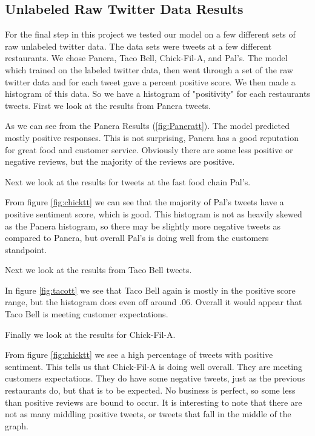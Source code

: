 \documentclass[titlepage,letterpaper]{article}
\begin{document}
\subsection{Unlabeled Raw Twitter Data Results}



For the final step in this project we tested our model on a few different sets of raw unlabeled twitter data. The data sets were tweets at a few different restaurants. We chose Panera, Taco Bell, Chick-Fil-A, and Pal's. The model which trained on the labeled twitter data, then went through a set of the raw twitter data and for each tweet gave a percent positive score. We then made a histogram of this data. So we have a histogram of "positivity" for each restaurants tweets. First we look at the results from Panera tweets. 



As we can see from the Panera Results (\cref{fig:Paneratt}). The model predicted mostly positive responses. This is not surprising, Panera has a good reputation for great food and customer service. Obviously there are some less positive or negative reviews, but the majority of the reviews are positive.

Next we look at the results for tweets at the fast food chain Pal's.



From figure \cref{fig:chicktt} we can see that the majority of Pal's tweets have a positive sentiment score, which is good. This histogram is not as heavily skewed as the Panera histogram, so there may be slightly more negative tweets as compared to Panera, but overall Pal's is doing well from the customers standpoint. 

Next we look at the results from Taco Bell tweets.



In figure \cref{fig:tacott} we see that Taco Bell again is mostly in the positive score range, but the histogram does even off around $.06$. Overall it would appear that Taco Bell is meeting customer expectations. 

Finally we look at the results for Chick-Fil-A.


%

From figure \cref{fig:chicktt} we see a high percentage of tweets with positive sentiment. This tells us that Chick-Fil-A is doing well overall. They are meeting customers expectations. They do have some negative tweets, just as the previous restaurants do, but that is to be expected. No business is perfect, so some less than positive reviews are bound to occur. It is interesting to note that there are not as many middling positive tweets, or tweets that fall in the middle of the graph.


\newpage


\end{document}
